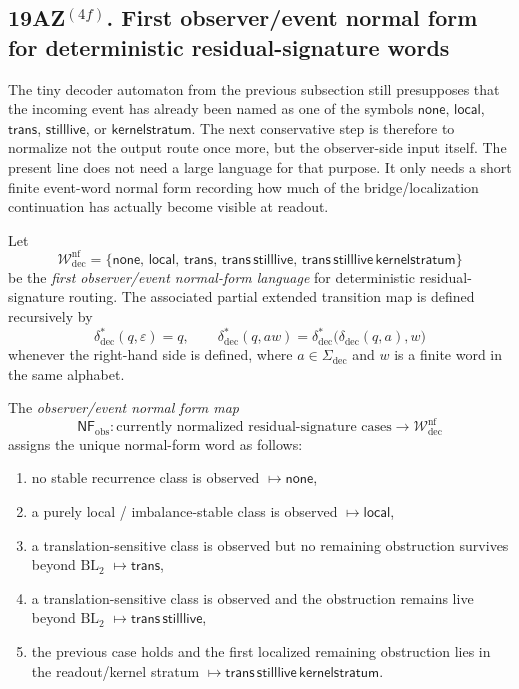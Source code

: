 \subsection*{19AZ$^{(4f)}$. First observer/event normal form for deterministic residual-signature words}
\label{sec:first-observer-event-normal-form-deterministic-residual-signature-words}
The tiny decoder automaton from the previous subsection still presupposes that the incoming event has already been named as one of the symbols \(\mathsf{none}\), \(\mathsf{local}\), \(\mathsf{trans}\), \(\mathsf{stilllive}\), or \(\mathsf{kernelstratum}\). The next conservative step is therefore to normalize not the output route once more, but the observer-side input itself. The present line does not need a large language for that purpose. It only needs a short finite event-word normal form recording how much of the bridge/localization continuation has actually become visible at readout.

\begin{definition}
\label{def:first-observer-event-normal-form-deterministic-residual-signature-words}
Let
\[
\mathcal W^{\mathrm{nf}}_{\mathrm{dec}}
=
\bigl\{
\mathsf{none},\,
\mathsf{local},\,
\mathsf{trans},\,
\mathsf{trans}\,\mathsf{stilllive},\,
\mathsf{trans}\,\mathsf{stilllive}\,\mathsf{kernelstratum}
\bigr\}
\]
be the \emph{first observer/event normal-form language} for deterministic residual-signature routing. The associated partial extended transition map is defined recursively by
\[
\delta^{\ast}_{\mathrm{dec}}(q,\varepsilon)=q,
\qquad
\delta^{\ast}_{\mathrm{dec}}(q,aw)=
\delta^{\ast}_{\mathrm{dec}}\bigl(\delta_{\mathrm{dec}}(q,a),w\bigr)
\]
whenever the right-hand side is defined, where \(a\in\Sigma_{\mathrm{dec}}\) and \(w\) is a finite word in the same alphabet.

The \emph{observer/event normal form map}
\[
\mathsf{NF}_{\mathrm{obs}}: \text{currently normalized residual-signature cases}
\longrightarrow \mathcal W^{\mathrm{nf}}_{\mathrm{dec}}
\]
assigns the unique normal-form word as follows:
\begin{enumerate}[label=(\roman*)]
 \item no stable recurrence class is observed \(\mapsto \mathsf{none}\),
 \item a purely local / imbalance-stable class is observed \(\mapsto \mathsf{local}\),
 \item a translation-sensitive class is observed but no remaining obstruction survives beyond \(\mathrm{BL}_2\) \(\mapsto \mathsf{trans}\),
 \item a translation-sensitive class is observed and the obstruction remains live beyond \(\mathrm{BL}_2\) \(\mapsto \mathsf{trans}\,\mathsf{stilllive}\),
 \item the previous case holds and the first localized remaining obstruction lies in the readout/kernel stratum \(\mapsto \mathsf{trans}\,\mathsf{stilllive}\,\mathsf{kernelstratum}\).
\end{enumerate}
\end{definition}

